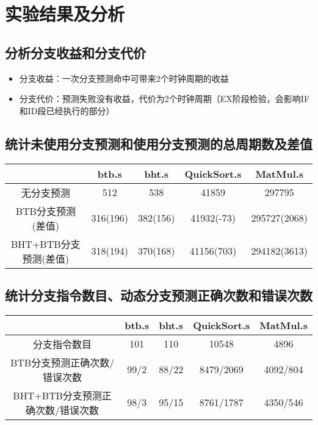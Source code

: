 \documentclass[UTF8]{article}
\begin{document}
    \section{实验结果及分析}
    \subsection{分析分支收益和分支代价}
    \begin{itemize}
        \item 分支收益：一次分支预测命中可带来2个时钟周期的收益
        \item 分支代价：预测失败没有收益，代价为2个时钟周期（EX阶段检验，会影响IF和ID段已经执行的部分）
    \end{itemize}
    \subsection{统计未使用分支预测和使用分支预测的总周期数及差值}
    \begin{table}[H]
        \centering
        \begin{tabular}{ccccc}
            \hline
            ~ & btb.s & bht.s & QuickSort.s & MatMul.s \\
            \hline
            无分支预测 & 512 & 538 & 41859 & 297795 \\
            BTB分支预测(差值) & 316(196) & 382(156) & 41932(-73) & 295727(2068) \\
            BHT+BTB分支预测(差值) & 318(194) & 370(168) & 41156(703) & 294182(3613) \\
            \hline
        \end{tabular}
    \end{table}
    \subsection{统计分支指令数目、动态分支预测正确次数和错误次数}
    \begin{table}[H]
        \centering
        \begin{tabular}{ccccc}
            \hline
            ~ & btb.s & bht.s & QuickSort.s & MatMul.s \\
            \hline
            分支指令数目 & 101 & 110 & 10548 & 4896 \\
            BTB分支预测正确次数/错误次数 & 99/2 & 88/22 & 8479/2069 & 4092/804 \\
            BHT+BTB分支预测正确次数/错误次数 & 98/3 & 95/15 & 8761/1787 & 4350/546 \\
            \hline
        \end{tabular}
    \end{table}
\end{document}
